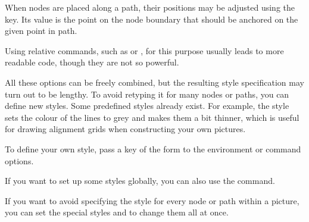 When nodes are placed along a path, their positions may be adjusted using the
 key. Its value is the point on the node boundary that should be
anchored on the given point in path.
\begin{example}
\end{example}
Using relative commands, such as  or , for this
purpose usually leads to more readable code, though they are not so powerful.
\begin{example}
\end{example}

All these options can be freely combined, but the resulting style specification
may turn out to be lengthy. To avoid retyping it for many nodes or paths, you
can define new styles. Some predefined styles already exist. For example, the
 style sets the colour of the lines to grey and makes them a bit
thinner, which is useful for drawing alignment grids when constructing your own
pictures.
\begin{example}
\end{example}
To define your own style, pass a key of the form
 to the \TikZ{} environment or
command options.
\begin{example}[vertical_mode, examplewidth=0.7\linewidth]
\end{example}
If you want to set up some styles globally, you can also use the 
command.
\begin{example}
\end{example}
If you want to avoid specifying the style for every node or path within a
\TikZ{} picture, you can set the special styles  and
 to change them all at once.
\begin{example}
\end{example}

